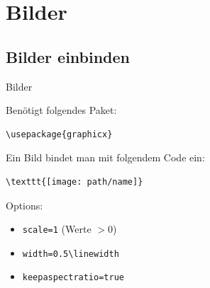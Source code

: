 \section{Bilder}
\subsection{Bilder einbinden}
\begin{frame}[fragile]{Bilder}
\begin{minipage}{0.6\linewidth}
Benötigt folgendes Paket:
\begin{lstlisting}[style=tex]
\usepackage{graphicx}
\end{lstlisting}

Ein Bild bindet man mit folgendem Code ein:

\begin{lstlisting}[style=tex]
\texttt{[image: path/name]}
\end{lstlisting}

Options:
\begin{itemize}
\item \verb|scale=1| (Werte $>0$)
\item \verb|width=0.5\linewidth|
\item \verb|keepaspectratio=true|
\end{itemize}


\end{minipage}
\end{frame}
